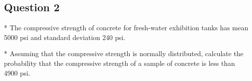 


\subsection*{Question 2}

* The compressive strength of concrete for fresh-water exhibition tanks has mean 5000 psi and standard deviation 240 psi. 

* Assuming that the compressive strength is normally distributed, calculate the probability that the compressive strength of a sample of concrete is less than 4900 psi.


